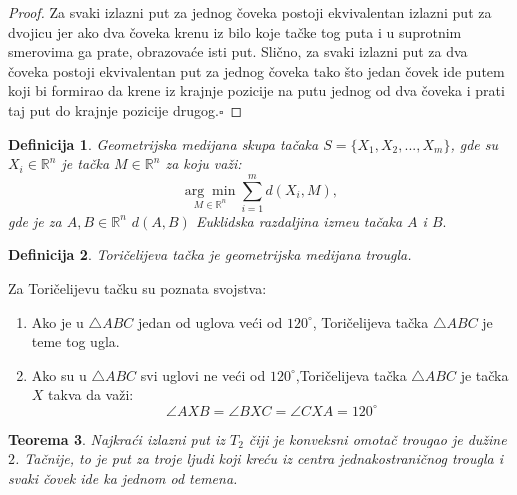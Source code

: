 \documentclass[11pt,letter]{article}
\newtheorem{teo}{\bf Teorema}[section]
\newtheorem{df}[teo]{\bf Definicija}
\newcommand{\qed}{\hfill $\square$ \bigskip}
\begin{document}
\begin{proof}
Za svaki izlazni put za jednog \v coveka postoji ekvivalentan izlazni put za dvojicu jer ako dva \v coveka krenu iz bilo koje ta\v cke tog puta i u suprotnim smerovima ga prate, obrazova\' ce isti put. Sli\v cno, za svaki izlazni put za dva \v coveka postoji ekvivalentan put za jednog \v coveka tako \v sto jedan \v covek ide putem koji bi formirao da krene iz krajnje pozicije na putu jednog od dva \v coveka i prati taj put do krajnje pozicije drugog.\qed
\end{proof}
\begin{df} Geometrijska medijana skupa ta\v caka $S=\{ X_1, X_2, ..., X_m\}$, gde su $X_i\in \mathbb{R}^n$ je ta\v cka $M\in \mathbb{R}^n$ za koju va\v zi:
$$\underset{M\in \mathbb{R}^n}{\arg\min} \sum^m_{i=1}{d(X_i, M)}, $$
gde je za $A,B\in \mathbb{R}^n$ $d(A, B)$ Euklidska razdaljina izme\dj u ta\v caka $A$ i $B.$\end{df}
\begin{df} Tori\v celijeva ta\v cka je geometrijska medijana trougla. \end{df}
\indent Za Tori\v celijevu ta\v cku su poznata svojstva:
\begin{enumerate}
\item Ako je u $\bigtriangleup ABC$ jedan od uglova ve\' ci od $120^\circ$, Tori\v celijeva ta\v cka $\bigtriangleup ABC$ je teme tog ugla.
\item Ako su u $\bigtriangleup ABC$ svi uglovi ne ve\' ci od $120^\circ$,Tori\v celijeva ta\v cka $\bigtriangleup ABC$ je ta\v cka $X$ takva da va\v zi:
$$\angle AXB=\angle BXC= \angle CXA=120^\circ$$
\end{enumerate}


\begin{teo} Najkra\' ci izlazni put iz $T_2$ \v ciji je konveksni omota\v c trougao je du\v zine $2$. Ta\v cnije, to je put za troje ljudi koji kre\' cu iz centra jednakostrani\v cnog trougla i svaki \v covek ide ka jednom od temena.
\end{teo}
\end{document}
